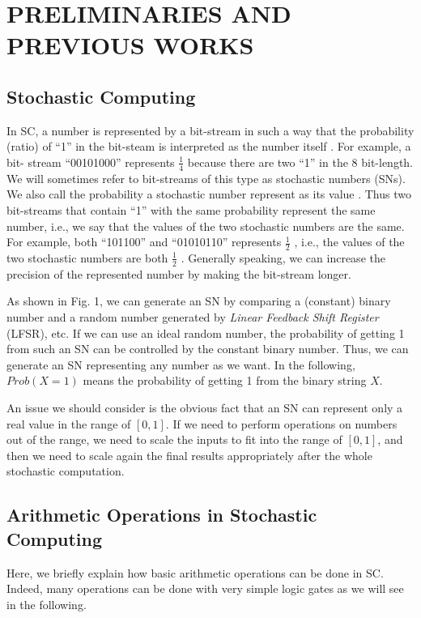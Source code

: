 \documentclass[10pt,conference]{IEEEtran}
\begin{document}
\section{PRELIMINARIES AND PREVIOUS WORKS}
\label{prelims & prevs}
\subsection{Stochastic Computing}
In SC, a number is represented by a bit-stream in such
a way that the probability (ratio) of “1” in the bit-steam
is interpreted as the number itself \cite{two}. For example, a bit-
stream “00101000” represents
$\frac{1}{4}$
because there are two “1”
in the 8 bit-length. We will sometimes refer to bit-streams
of this type as
stochastic numbers
(SNs). We also call the
probability a stochastic number represent as its
value
. Thus
two bit-streams that contain “1” with the same probability
represent the same number, i.e., we say that the values of
the two stochastic numbers are the same. For example, both
“101100” and “01010110” represents
$\frac{1}{2}$
, i.e., the values of the
two stochastic numbers are both
$\frac{1}{2}$
. Generally speaking, we can
increase the
precision
of the represented number by making
the bit-stream longer.
\par
As shown in Fig. 1, we can generate an SN by comparing
a (constant) binary number and a random number generated
by \textit{Linear Feedback Shift Register} (LFSR), etc. If we can use
an ideal random number, the probability of getting 1 from
such an SN can be controlled by the constant binary number.
Thus, we can generate an SN representing any number as we
want. In the following,
$Prob(X = 1)$ means the probability of getting 1 from the binary string $X$.

\par
An issue we should consider is the obvious fact that an SN
can represent only a real value in the range of
$[0,1]$. If we need to perform operations on numbers out of the range, we
need to scale the inputs to fit into the range of
$[0,1]$, and then
we need to scale again the final results appropriately after the whole stochastic computation.

\subsection{Arithmetic Operations in Stochastic Computing}
Here, we briefly explain how basic arithmetic operations
can be done in SC. Indeed, many operations can be done with
very simple logic gates as we will see in the following.
\end{document}
